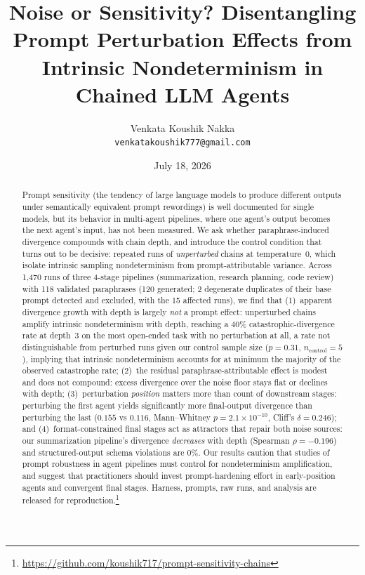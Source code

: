 \documentclass[11pt]{article}
\title{\textbf{Noise or Sensitivity? Disentangling Prompt Perturbation Effects
from Intrinsic Nondeterminism in Chained LLM Agents}}
\author{Venkata Koushik Nakka\\
\texttt{venkatakoushik777@gmail.com}}
\date{July 18, 2026}
\begin{document}
\maketitle

\begin{abstract}
Prompt sensitivity (the tendency of large language models to produce
different outputs under semantically equivalent prompt rewordings) is well
documented for single models, but its behavior in multi-agent pipelines,
where one agent's output becomes the next agent's input, has not been
measured. We ask whether paraphrase-induced divergence compounds with chain
depth, and introduce the control condition that turns out to be decisive:
repeated runs of \emph{unperturbed} chains at temperature~0, which isolate
intrinsic sampling nondeterminism from prompt-attributable variance. Across
1{,}470 runs of three 4-stage pipelines (summarization, research planning,
code review) with 118 validated paraphrases (120 generated; 2 degenerate
duplicates of their base prompt detected and excluded, with the 15 affected
runs), we find that (1)~apparent divergence growth with depth is largely
\emph{not} a prompt effect: unperturbed chains amplify intrinsic
nondeterminism with depth, reaching a 40\% catastrophic-divergence rate at
depth~3 on the most open-ended task with no perturbation at all, a rate not
distinguishable from perturbed runs given our control sample size
($p=0.31$, $n_{\mathrm{control}}=5$), implying that intrinsic nondeterminism
accounts for at minimum the majority of the observed catastrophe rate;
(2)~the residual paraphrase-attributable effect is modest and does not
compound: excess divergence over the noise floor stays flat or declines
with depth; (3)~perturbation \emph{position} matters more than count of
downstream stages: perturbing the first agent yields significantly more
final-output divergence than perturbing the last ($0.155$ vs $0.116$,
Mann--Whitney $p = 2.1\times10^{-10}$, Cliff's $\delta = 0.246$); and
(4)~format-constrained final stages act as attractors that repair both noise
sources: our summarization pipeline's divergence \emph{decreases} with
depth (Spearman $\rho = -0.196$) and structured-output schema violations are
0\%. Our results caution that studies of prompt robustness in agent
pipelines must control for nondeterminism amplification, and suggest that
practitioners should invest prompt-hardening effort in early-position agents
and convergent final stages. Harness, prompts, raw runs, and analysis are
released for reproduction.\footnote{\url{https://github.com/koushik717/prompt-sensitivity-chains}}
\end{abstract}
\end{document}
